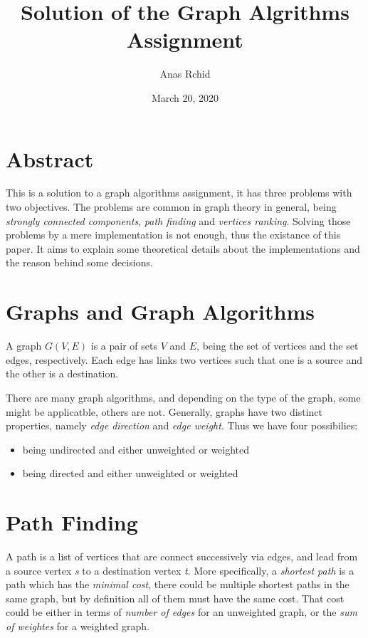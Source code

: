\documentclass[12pt]{article}
\title{Solution of the Graph Algrithms Assignment}
\author{Anas Rchid}
\date{March 20, 2020}
\begin{document}
\maketitle

\section*{Abstract}

This is a solution to a graph algorithms assignment, it has three problems with two objectives. The problems are common in graph theory in general, being \textit{strongly connected components}, \textit{path finding} and \textit{vertices ranking}. Solving those problems by a mere implementation is not enough, thus the existance of this paper. It aims to explain some theoretical details about the implementations and the reason behind some decisions.

\section{Graphs and Graph Algorithms}

A graph $G(V,E)$ is a pair of sets $V$ and $E$, being the set of vertices and the set edges, respectively. Each edge has links two vertices such that one is a source and the other is a destination.

There are many graph algorithms, and depending on the type of the graph, some might be applicatble, others are not.  Generally, graphs have two distinct properties, namely \textit{edge direction} and \textit{edge weight}. Thus we have four possibilies:

\begin{itemize}
\item being undirected and either unweighted or weighted
\item being directed and either unweighted or weighted
\end{itemize}

\section{Path Finding}

A path is a list of vertices that are connect successively via edges, and lead from a source vertex \textit{s} to a destination vertex \textit{t}. More specifically, a \textit{shortest path} is a path which has the \textit{minimal cost}, there could be multiple shortest paths in the same graph, but by definition all of them must have the same cost. That cost could be either in terms of \textit{number of edges} for an unweighted graph, or the \textit{sum of weightes} for a weighted graph.
\end{document}
